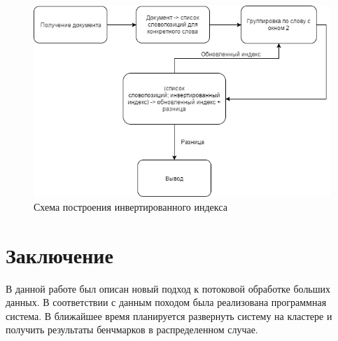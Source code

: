 \documentclass[14pt]{matmex-diploma-custom}
\begin{document}
\begin{figure}[h]
\centering
\includegraphics[width=\textwidth,height=\textheight,keepaspectratio]{pics/II.png}
\caption{Схема построения инвертированного индекса}
\end{figure}

\section*{Заключение}

В данной работе был описан новый подход к потоковой обработке больших данных. В соответствии с данным походом была реализована программная система. В ближайшее время планируется развернуть систему на кластере и получить результаты бенчмарков в распределенном случае.

\setmonofont[Mapping=tex-text]{CMU Typewriter Text}


\end{document}
